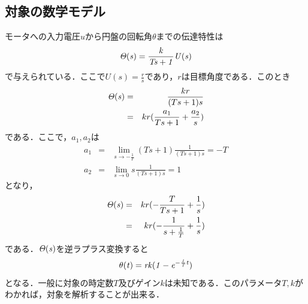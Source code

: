 \documentclass[11pt,a4paper]{jsarticle}
\begin{document}
  \subsection{対象の数学モデル}
  モータへの入力電圧$u$から円盤の回転角$\theta$までの伝達特性は
  \begin{equation}
  \it{\Theta} (s) = \frac{k}{Ts + 1} U(s)
    \label{eq1}
  \end{equation}
  で与えられている．ここで$U(s) = \frac{r}{s}$であり，$r$は目標角度である．このとき
  \begin{eqnarray}
   \it{\Theta(s)} & = & \frac{kr}{(Ts + 1)s}  \nonumber \\ 
    & = & kr(\frac{a_1}{Ts + 1} + \frac{a_2}{s})
    \label{eq2}
  \end{eqnarray}
  である．ここで，$a_1,a_2$は
  \begin{eqnarray*}
   a_1 & = & \lim_{s \to -\frac{1}{T}} (Ts + 1) \frac{1}{(Ts +1)s} = -T \\
   a_2 & = & \lim_{s \to 0} s \frac{1}{(Ts +1)s} = 1 
  \end{eqnarray*}
  となり，
  \begin{eqnarray*}
 \it{\Theta(s)} & = & kr(- \frac{T}{Ts + 1} + \frac{1}{s}) \\
& = & kr(- \frac{1}{s + \frac{1}{T}} + \frac{1}{s})
  \end{eqnarray*}
  である．$\it{\Theta(s)}$を逆ラプラス変換すると
  \begin{equation}
   \it{\theta(t)} = rk(1-e^{-\frac{1}{T} t})
    \label{eq3}
  \end{equation}
  となる．一般に対象の時定数$T$及びゲイン$k$は未知である．このパラメータ$T,k$がわかれば，対象を解析することが出来る．
\end{document}
